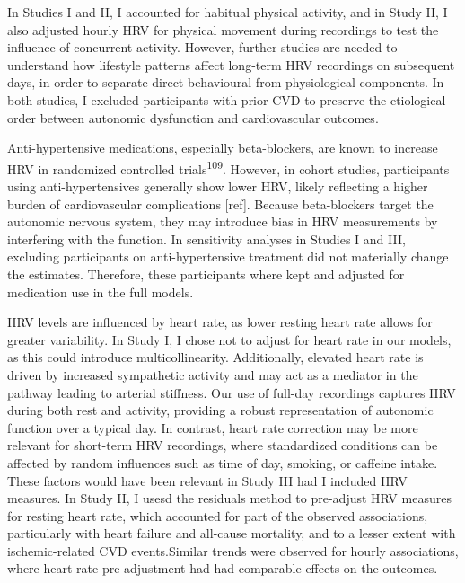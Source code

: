 \documentclass[
  a4paper,
  headsepline=true,
  open=any]{scrbook}
\begin{document}
In Studies I and II, I accounted for habitual physical activity, and in
Study II, I also adjusted hourly HRV for physical movement during
recordings to test the influence of concurrent activity. However,
further studies are needed to understand how lifestyle patterns affect
long-term HRV recordings on subsequent days, in order to separate direct
behavioural from physiological components. In both studies, I excluded
participants with prior CVD to preserve the etiological order between
autonomic dysfunction and cardiovascular outcomes.

Anti-hypertensive medications, especially beta-blockers, are known to
increase HRV in randomized controlled trials\textsuperscript{109}.
However, in cohort studies, participants using anti-hypertensives
generally show lower HRV, likely reflecting a higher burden of
cardiovascular complications {[}ref{]}. Because beta-blockers target the
autonomic nervous system, they may introduce bias in HRV measurements by
interfering with the function. In sensitivity analyses in Studies I and
III, excluding participants on anti-hypertensive treatment did not
materially change the estimates. Therefore, these participants where
kept and adjusted for medication use in the full models.

HRV levels are influenced by heart rate, as lower resting heart rate
allows for greater variability. In Study I, I chose not to adjust for
heart rate in our models, as this could introduce multicollinearity.
Additionally, elevated heart rate is driven by increased sympathetic
activity and may act as a mediator in the pathway leading to arterial
stiffness. Our use of full-day recordings captures HRV during both rest
and activity, providing a robust representation of autonomic function
over a typical day. In contrast, heart rate correction may be more
relevant for short-term HRV recordings, where standardized conditions
can be affected by random influences such as time of day, smoking, or
caffeine intake. These factors would have been relevant in Study III had
I included HRV measures. In Study II, I usesd the residuals method to
pre-adjust HRV measures for resting heart rate, which accounted for part
of the observed associations, particularly with heart failure and
all-cause mortality, and to a lesser extent with ischemic-related CVD
events.Similar trends were observed for hourly associations, where heart
rate pre-adjustment had had comparable effects on the outcomes.
\end{document}
